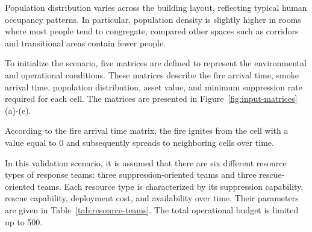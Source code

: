 Population distribution varies across the building layout, reflecting typical human occupancy patterns. In particular, population density is slightly higher in rooms where most people tend to congregate, compared other spaces such as corridors and transitional areas contain fewer people.

To initialize the scenario, five matrices are defined to represent the environmental and operational conditions. These matrices describe the fire arrival time, smoke arrival time, population distribution, asset value, and minimum suppression rate required for each cell. The matrices are presented in Figure~\ref{fig:input-matrices}(a)-(e).

According to the fire arrival time matrix, the fire ignites from the cell with a value equal to 0 and subsequently spreads to neighboring cells over time.

In this validation scenario, it is assumed that there are six different resource types of response teams: three suppression-oriented teams and three rescue-oriented teams. Each resource type is characterized by its suppression capability, rescue capability, deployment cost, and availability over time. Their parameters are given in Table~\ref{tab:resource-teams}. The total operational budget is limited up to 500.

